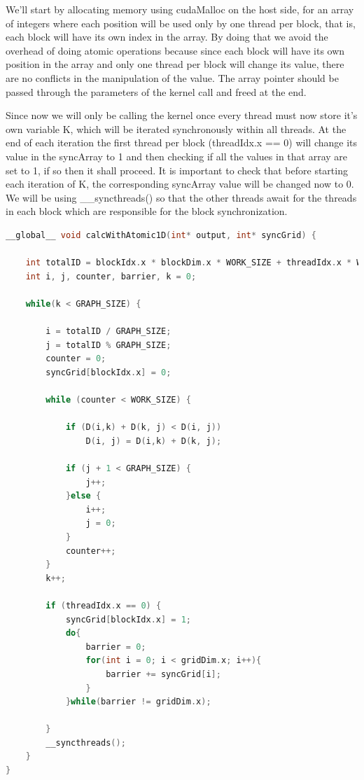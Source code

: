 \documentclass[conference]{IEEEtran}
\begin{document}
We'll start by allocating memory using cudaMalloc on the host side, for an array of integers where each position will be used only by one thread per block, that is, each block will have its own index in the array. By doing that we avoid the overhead of doing atomic operations because since each block will have its own position in the array and only one thread per block will change its value, there are no conflicts in the manipulation of the value. The array pointer should be passed through the parameters of the kernel call and freed at the end.

Since now we will only be calling the kernel once every thread must now store it's own variable K, which will be iterated synchronously within all threads.  At the end of each iteration the first thread per block (threadIdx.x == 0) will change its value in the syncArray to 1 and then checking if all the values in that array are set to 1, if so then it shall proceed. It is important to check that before starting each iteration of K, the corresponding syncArray value will be changed now to 0.
We will be using \_\_syncthreads() so that the other threads await for the threads in each block which are responsible for the block synchronization.


\begin{lstlisting}[language=C++, caption=CUDA implementation with synchronization]
__global__ void calcWithAtomic1D(int* output, int* syncGrid) {

	int totalID = blockIdx.x * blockDim.x * WORK_SIZE + threadIdx.x * WORK_SIZE;
	int i, j, counter, barrier, k = 0;

	while(k < GRAPH_SIZE) {
	
		i = totalID / GRAPH_SIZE;
		j = totalID % GRAPH_SIZE;
		counter = 0;
		syncGrid[blockIdx.x] = 0;
		
		while (counter < WORK_SIZE) {
		
			if (D(i,k) + D(k, j) < D(i, j))
				D(i, j) = D(i,k) + D(k, j);
			
			if (j + 1 < GRAPH_SIZE) {
				j++;
			}else {
				i++;
				j = 0;
			}
			counter++;
		}
		k++;

		if (threadIdx.x == 0) {
			syncGrid[blockIdx.x] = 1;
			do{
				barrier = 0;
				for(int i = 0; i < gridDim.x; i++){
					barrier += syncGrid[i];
				}
			}while(barrier != gridDim.x);
		
		}
		__syncthreads();
	}
}
\end{lstlisting}
\end{document}
